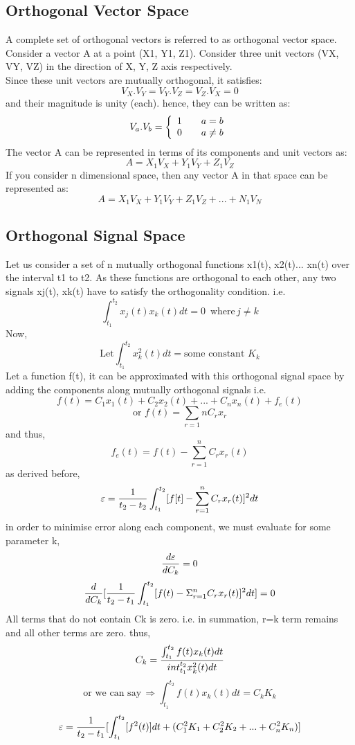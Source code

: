 \documentclass[a4paper,12pt]{book}
\begin{document}
\subsection{Orthogonal Vector Space}
A complete set of orthogonal vectors is referred to as orthogonal vector space.\\
Consider a vector A at a point (X1, Y1, Z1). Consider three unit vectors (VX, VY, VZ) in the direction of X, Y, Z axis respectively.\\
Since these unit vectors are mutually orthogonal, it satisfies:
$$V_X. V_Y= V_Y. V_Z= V_Z. V_X = 0$$
and their magnitude is unity (each).
hence, they can be written as:
\[V_a . V_b =  \left\{
\begin{array}{l l}
    1 & \quad a = b \\
    0 & \quad a \neq b
  \end{array} \right.
\]
The vector A can be represented in terms of its components and unit vectors as:
$$A = X_1 V_X + Y_1 V_Y + Z_1 V_Z$$
If you consider n dimensional space, then any vector A in that space can be represented as:
$$A = X_1 V_X + Y_1 V_Y + Z_1 V_Z+...+ N_1V_N$$
\subsection{Orthogonal Signal Space}
Let us consider a set of n mutually orthogonal functions x1(t), x2(t)... xn(t) over the interval t1 to t2. As these functions are orthogonal to each other, any two signals xj(t), xk(t) have to satisfy the orthogonality condition. i.e.
$$\int_{t_1}^{t_2} x_j(t)x_k(t)dt = 0 \,\,\, \text{where}\, j \neq k$$
Now,
$$\text{Let} \int_{t_1}^{t_2}x_{k}^{2}(t)dt =\text{some constant}\,\, K_k$$
Let a function f(t), it can be approximated with this orthogonal signal space by adding the components along mutually orthogonal signals i.e.
$$f(t) = C_1x_1(t) + C_2x_2(t) + ... + C_nx_n(t) + f_e(t)$$
$$\text{or}\,\, f(t) = \sum_{r=1}{n}C_rx_r $$
and thus,
$$f_e(t) = f(t) - \sum_{r=1}^n C_rx_r (t)$$
as derived before,
$$\varepsilon = {1 \over t_2 - t_2 } \int_{t_1}^{t_2} [ f[t] - \sum_{r=1}^{n} C_rx_r(t) ]^2 dt$$
in order to minimise error along each component, we must evaluate for some parameter k, $${d\varepsilon \over dC_k} = 0$$
$${d \over dC_k}[ {1 \over t_2 - t_1} \int_{t_1}^{t_2} [ f(t) - \Sigma_{r=1}^n C_rx_r(t)]^2 dt] = 0$$
All terms that do not contain Ck is zero. i.e. in summation, r=k term remains and all other terms are zero.
thus,
\begin{equation} C_k = {{\int_{t_1}^{t_2}f(t)x_k(t)dt} \over {int_{t_1}^{t_2} x_k^2 (t)dt}}\end{equation}
$$\text{or we can say}\, \Rightarrow \int_{t_1}^{t_2} f(t)x_k(t)dt = C_kK_k$$
$$\varepsilon = {1 \over t_2 - t_1 } [\int_{t_1}^{t_2} [f^2 (t)] dt + (C_1^2 K_1 + C_2^2 K_2 + ... + C_n^2 K_n)]$$
\end{document}
